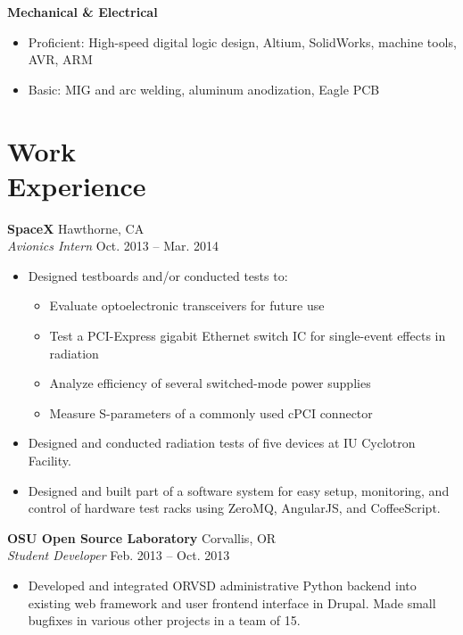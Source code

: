 \documentclass[10pt,letterpaper,margin]{res}
\begin{document}
\begin{resume}
{\bf Mechanical \& Electrical}\vspace{0.2em}

\begin{itemize}
	\item Proficient: High-speed digital logic design, Altium, SolidWorks, machine tools, AVR, ARM
	\item Basic: \hspace{17pt} MIG and arc welding, aluminum anodization, Eagle PCB
\end{itemize}



\section{Work \\ Experience}

{\bf SpaceX} \hfill {\color{lightgray} Hawthorne, CA} \\
{\it Avionics Intern} \hfill {\color{lightgray} Oct. 2013 -- Mar. 2014}\vspace{0.2em}

\begin{itemize}
	\item Designed testboards and/or conducted tests to:
		\begin{itemize}
			\item Evaluate optoelectronic transceivers for future use
			\item Test a PCI-Express gigabit Ethernet switch IC for
				single-event effects in radiation
			\item Analyze efficiency of several switched-mode power supplies
			\item Measure S-parameters of a commonly used cPCI connector
		\end{itemize}
	\item Designed and conducted radiation tests of five devices at IU
		Cyclotron Facility.
	\item Designed and built part of a software system for easy setup,
		monitoring, and control of hardware test racks using ZeroMQ, AngularJS,
		and CoffeeScript.
\end{itemize}


{\bf OSU Open Source Laboratory} \hfill {\color{lightgray} Corvallis, OR} \\
{\it Student Developer} \hfill {\color{lightgray} Feb. 2013 -- Oct. 2013}\vspace{0.2em}

\begin{itemize}
	\item Developed and integrated ORVSD administrative Python backend into
		existing web framework and user frontend interface in Drupal. Made
		small bugfixes in various other projects in a team of 15.
\end{itemize}



\end{resume}
\end{document}
